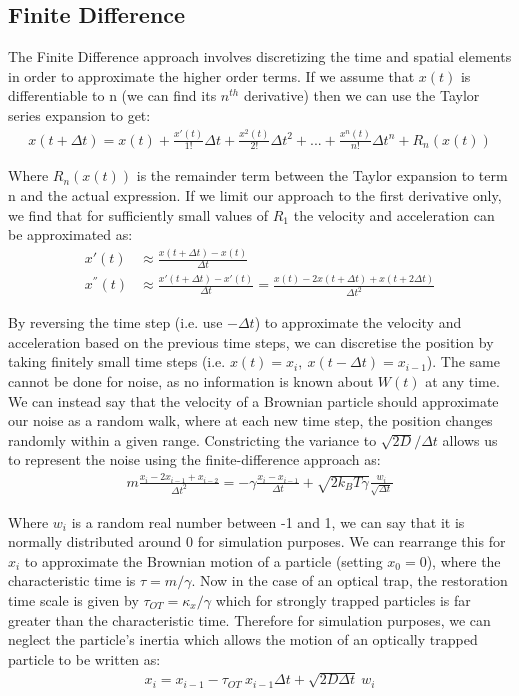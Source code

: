 \subsection{Finite Difference}
The Finite Difference approach involves discretizing the time and spatial 
elements in order to approximate the higher order terms. If we assume that 
$x(t)$ is differentiable to n (we can find its $n^{th}$ derivative) then 
we can use the Taylor series expansion to get:
\begin{align}
	x(t+\Delta t) = x(t)+\frac{x'(t)}{1!}\Delta t + \frac{x^2(t)}{2!}\Delta t^2+...+\frac{x^n(t)}{n!}\Delta t^n+R_n(x(t))	
\end{align}

Where $R_n(x(t))$ is the remainder term between the Taylor expansion to 
term n and the actual expression. If we limit our approach to the first 
derivative only, we find that for sufficiently small values of $R_1$ the 
velocity and acceleration can be approximated as:
\begin{align}
	x'(t) &\approx \frac{x(t+\Delta t)-x(t)}{\Delta t}
	\\
	x^{''}(t) &\approx \frac{x'(t+\Delta t)-x'(t)}{\Delta t} = \frac{x(t)-2x(t+\Delta t)+x(t+2\Delta t)}{\Delta t^2}
\end{align}

By reversing the time step (i.e. use $-\Delta t$) to approximate the
velocity and acceleration based on the previous time steps, we can 
discretise the position by taking finitely small  time steps (i.e. 
$x(t) = x_i,\ x(t-\Delta t) = x_{i-1}$). The same cannot be done for 
noise, as no information is known about $W(t)$ at any time. We 
can instead say that the velocity of a Brownian particle should 
approximate our noise as a random walk, where at each new time 
step, the position changes randomly within a given range. Constricting 
the variance to $\sqrt{2D}/\Delta t$ allows us to represent the 
noise using the finite-difference approach as:
\begin{align}
	m\frac{x_i-2x_{i-1}+x_{i-2}}{\Delta t^2} = -\gamma\frac{x_i-x_{i-1}}{\Delta t}+\sqrt{2k_BT\gamma}\frac{w_i}{\sqrt{\Delta t}}
\end{align}

Where $w_i$ is a random real number between -1 and 1, we can say that 
it is normally distributed around 0 for simulation purposes. We can 
rearrange this for $x_i$ to approximate the Brownian motion of a 
particle (setting $x_0=0$), where the characteristic time is $\tau = m/\gamma$. 
Now in the case of an optical trap, the restoration time scale is 
given by $\tau_{OT}=\kappa_x/\gamma$ which for strongly trapped particles 
is far greater than the characteristic time. Therefore for simulation 
purposes, we can neglect the particle's inertia which allows the motion 
of an optically trapped particle to be written as:
\begin{align}
	\label{eq:sim_langevin}
	x_i = x_{i-1} - \tau_{OT}\ x_{i-1}\Delta t + \sqrt{2D\Delta t}\ w_i
\end{align} 

